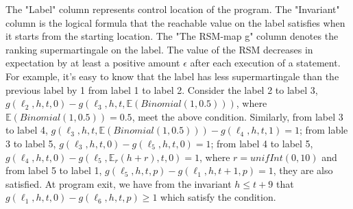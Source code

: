 \documentclass[sigconf,review, anonymous]{acmart}
\begin{document}
The "Label" column represents control location of the program. The "Invariant" column is the logical formula that the reachable value on the label satisfies when it starts from the starting location. The "The RSM-map g" column denotes the ranking supermartingale on the label. The value of the RSM decreases in expectation by at least a positive amount $\epsilon$ after each execution of a statement. For example, it's easy to know that the label has less supermartingale than the previous label by 1 from label 1 to label 2. Consider the label 2 to label 3, $g(\ell_2,h,t,0)-g(\ell_3,h,t,\mathbb{E}(Binomial(1,0.5)))$, where $\mathbb{E}(Binomial(1,0.5))=0.5$, meet the above condition. Similarly, from label 3 to label 4, $g(\ell_3,h,t,\mathbb{E}(Binomial(1,0.5)))-g(\ell_4,h,t,1)=1$; from lable 3 to label 5, $g(\ell_3,h,t,0)-g(\ell_5,h,t,0)=1$; from label 4 to label 5,  $g(\ell_4,h,t,0)-g(\ell_5,\mathbb{E}_r(h+r),t,0)=1$, where $r=unifInt(0,10)$ and from label 5 to label 1, $g(\ell_5,h,t,p) -g(\ell_1,h,t+1,p)=1$, they are also satisfied. At program exit, we have from the invariant $h\leq t+9$ that $g(\ell_1,h,t,0)-g(\ell_6,h,t,p)\geq 1$ which satisfy the condition.
\end{document}
